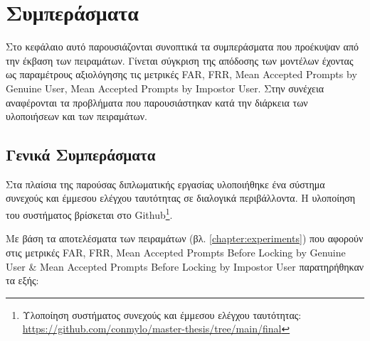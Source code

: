\chapter{Συμπεράσματα}
\label{chapter:conclusions}

Στο κεφάλαιο αυτό παρουσιάζονται συνοπτικά τα συμπεράσματα που προέκυψαν από την έκβαση των πειραμάτων.
Γίνεται σύγκριση της απόδοσης των μοντέλων έχοντας ως
παραμέτρους αξιολόγησης τις μετρικές FAR, FRR, Mean Accepted Prompts by Genuine User, Mean Accepted Prompts by Impostor User.
Στην συνέχεια αναφέρονται τα προβλήματα που παρουσιάστηκαν
κατά την διάρκεια των υλοποιήσεων και των πειραμάτων.

\section{Γενικά Συμπεράσματα}
Στα πλαίσια της παρούσας διπλωματικής εργασίας υλοποιήθηκε ένα σύστημα συνεχούς και έμμεσου ελέγχου ταυτότητας σε διαλογικά περιβάλλοντα. Η υλοποίηση του συστήματος βρίσκεται στο Github\footnote{Υλοποίηση συστήματος συνεχούς και έμμεσου ελέγχου ταυτότητας: \url{https://github.com/conmylo/master-thesis/tree/main/final}}.

Με βάση τα αποτελέσματα των πειραμάτων (βλ. \autoref{chapter:experiments}) που αφορούν στις μετρικές FAR, FRR, Mean Accepted Prompts Before Locking by Genuine User \& Mean Accepted Prompts Before Locking by Impostor User παρατηρήθηκαν τα εξής:

